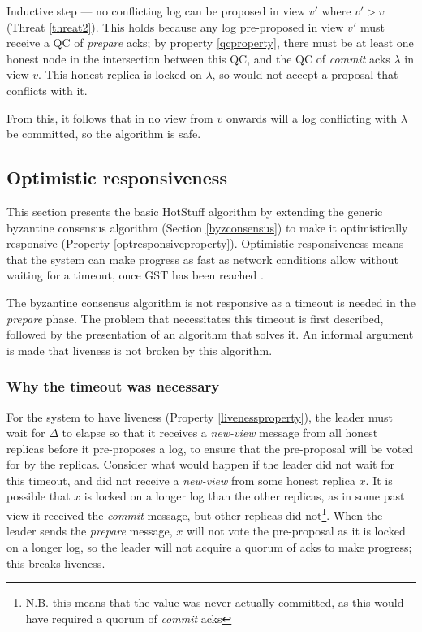 Inductive step --- no conflicting log can be proposed in view $v'$ where $v' > v$ (Threat \ref{threat2}). This holds because any log pre-proposed in view $v'$ must receive a QC of \textit{prepare} acks; by property \ref{qcproperty}, there must be at least one honest node in the intersection between this QC, and the QC of \textit{commit} acks $\lambda$ in view $v$. This honest replica is locked on $\lambda$, so would not accept a proposal that conflicts with it.

From this, it follows that in no view from $v$ onwards will a log conflicting with $\lambda$ be committed, so the algorithm is safe.

\subsection{Optimistic responsiveness} \label{optresponsive}
This section presents the basic HotStuff algorithm by extending the generic byzantine consensus algorithm (Section \ref{byzconsensus}) to make it optimistically responsive (Property \ref{optresponsiveproperty}). Optimistic responsiveness means that the system can make progress as fast as network conditions allow without waiting for a timeout, once GST has been reached \cite{passThunderellaBlockchainsOptimistic2018}.

The byzantine consensus algorithm is not responsive as a timeout is needed in the \textit{prepare} phase. The problem that necessitates this timeout is first described, followed by the presentation of an algorithm that solves it. An informal argument is made that liveness is not broken by this algorithm.

\subsubsection{Why the timeout was necessary}
For the system to have liveness (Property \ref{livenessproperty}), the leader must wait for $\Delta$ to elapse so that it receives a \textit{new-view} message from all honest replicas before it pre-proposes a log, to ensure that the pre-proposal will be voted for by the replicas. Consider what would happen if the leader did not wait for this timeout, and did not receive a \textit{new-view} from some honest replica $x$. It is possible that $x$ is locked on a longer log than the other replicas, as in some past view it received the \textit{commit} message, but other replicas did not\footnote{N.B. this means that the value was never actually committed, as this would have required a quorum of \textit{commit} acks}. When the leader sends the \textit{prepare} message, $x$ will not vote the pre-proposal as it is locked on a longer log, so the leader will not acquire a quorum of acks to make progress; this breaks liveness.

